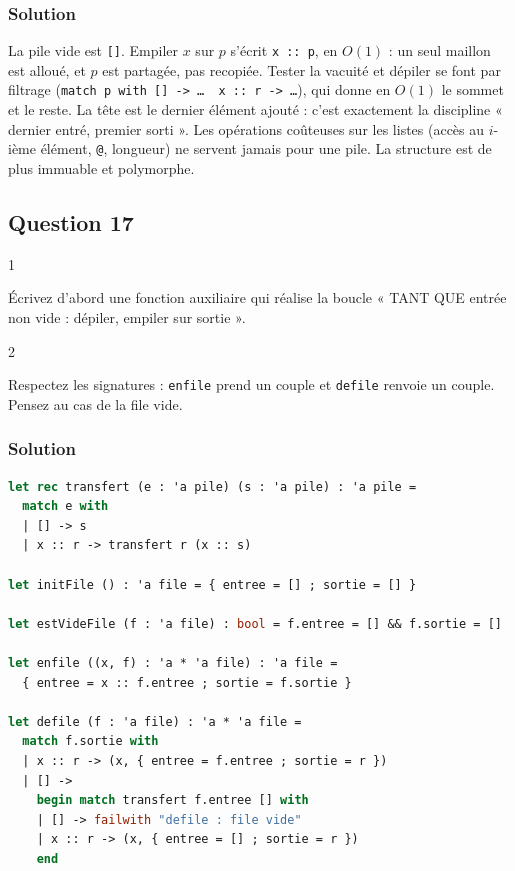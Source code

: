 \documentclass[11pt,a4paper]{article}
\begin{document}
\hypertarget{solution-15}{%
\subsubsection{Solution}\label{solution-15}}

La pile vide est \texttt{{[}{]}}. Empiler \(x\) sur \(p\) s'écrit \texttt{x\ ::\ p}, en \(O(1)\) : un seul maillon est alloué, et \(p\) est partagée, pas recopiée. Tester la vacuité et dépiler se font par filtrage (\texttt{match\ p\ with\ {[}{]}\allowbreak{}\ -\textgreater{}\ …\ \textbar{}\ x\ :\allowbreak{}:\allowbreak{}\ r\ -\textgreater{}\ …}), qui donne en \(O(1)\) le sommet et le reste. La tête est le dernier élément ajouté : c'est exactement la discipline « dernier entré, premier sorti ». Les opérations coûteuses sur les listes (accès au \(i\)-ième élément, \texttt{@}, longueur) ne servent jamais pour une pile. La structure est de plus immuable et polymorphe.

\hypertarget{question-17}{%
\subsection{Question 17}\label{question-17}}

\begin{indication}{1}

Écrivez d'abord une fonction auxiliaire qui réalise la boucle « TANT QUE entrée non vide : dépiler, empiler sur sortie ».

\end{indication}

\begin{indication}{2}

Respectez les signatures : \texttt{enfile} prend un couple et \texttt{defile} renvoie un couple. Pensez au cas de la file vide.

\end{indication}

\hypertarget{solution-16}{%
\subsubsection{Solution}\label{solution-16}}

\begin{lstlisting}[language=Caml]
let rec transfert (e : 'a pile) (s : 'a pile) : 'a pile =
  match e with
  | [] -> s
  | x :: r -> transfert r (x :: s)

let initFile () : 'a file = { entree = [] ; sortie = [] }

let estVideFile (f : 'a file) : bool = f.entree = [] && f.sortie = []

let enfile ((x, f) : 'a * 'a file) : 'a file =
  { entree = x :: f.entree ; sortie = f.sortie }

let defile (f : 'a file) : 'a * 'a file =
  match f.sortie with
  | x :: r -> (x, { entree = f.entree ; sortie = r })
  | [] ->
    begin match transfert f.entree [] with
    | [] -> failwith "defile : file vide"
    | x :: r -> (x, { entree = [] ; sortie = r })
    end
\end{lstlisting}
\end{document}
